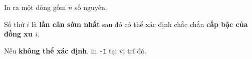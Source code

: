 In ra một dòng gồm $n$ số nguyên.

Số thứ $i$ là \textbf{lần cân sớm nhất} sau đó có thể xác định chắc chắn \textbf{cấp bậc của đồng xu $i$}.

Nếu \textbf{không thể xác định}, in \texttt{-1} tại vị trí đó.
